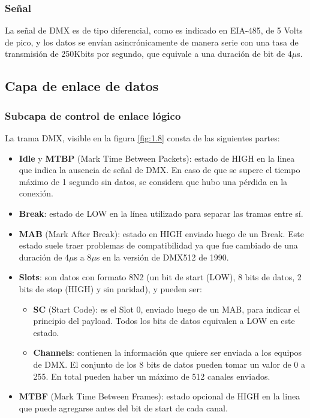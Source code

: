 \subsubsection{Señal}
La señal de DMX es de tipo diferencial, como es indicado en EIA-485, de 5 Volts de pico, y los datos se envían asincrónicamente de manera serie con una tasa de transmisión de 250Kbits por segundo, que equivale a una duración de bit de 4\(\mu \)s.


\subsection{Capa de enlace de datos}
\subsubsection{Subcapa de control de enlace lógico}
La trama DMX, visible en la figura \ref{fig:1.8} consta de las siguientes partes:

\begin{itemize}
	\item \textbf{Idle} y \textbf{MTBP} (Mark Time Between Packets): estado de HIGH en la linea que indica la ausencia de señal de DMX. En caso de que se supere el tiempo máximo de 1 segundo sin datos, se considera que hubo una pérdida en la conexión.
	\item \textbf{Break}: estado de LOW en la línea utilizado para separar las tramas entre sí.
	\item \textbf{MAB} (Mark After Break): estado en HIGH enviado luego de un Break. Este estado suele traer problemas de compatibilidad ya que fue cambiado de una duración de 4\(\mu \)s a 8\(\mu \)s en la versión de DMX512 de 1990.
	\item \textbf{Slots}: son datos con formato 8N2 (un bit de start (LOW), 8 bits de datos, 2 bits de stop (HIGH) y sin paridad), y pueden ser:
	\begin{itemize}
		\item \textbf{SC} (Start Code): es el Slot 0, enviado luego de un MAB, para indicar el principio del payload. Todos los bits de datos equivalen a LOW en este estado.
		\item \textbf{Channels}: contienen la información que quiere ser enviada a los equipos de DMX. El conjunto de los 8 bits de datos pueden tomar un valor de 0 a 255. En total pueden haber un máximo de 512 canales enviados.
	\end{itemize}
	\item \textbf{MTBF} (Mark Time Between Frames): estado opcional de HIGH en la linea que puede agregarse antes del bit de start de cada canal.
\end{itemize}


